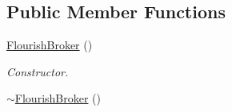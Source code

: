 \subsection*{Public Member Functions}
\begin{DoxyCompactItemize}
\item 
\hyperlink{classFlourishBroker_a6361ac77665c9d3f5205fe42b388c062}{Flourish\+Broker} ()\hypertarget{classFlourishBroker_a6361ac77665c9d3f5205fe42b388c062}{}\label{classFlourishBroker_a6361ac77665c9d3f5205fe42b388c062}

\begin{DoxyCompactList}\small\item\em Constructor. \end{DoxyCompactList}\item 
\hyperlink{classFlourishBroker_a665feb82cdd87e45ac307f9ba7fc91a2}{$\sim$\+Flourish\+Broker} ()\hypertarget{classFlourishBroker_a665feb82cdd87e45ac307f9ba7fc91a2}{}\label{classFlourishBroker_a665feb82cdd87e45ac307f9ba7fc91a2}


\end{DoxyCompactItemize}
